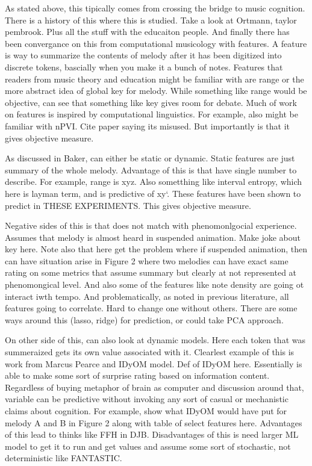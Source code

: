 \documentclass[english,man,floatsintext]{apa6}
\begin{document}
As stated above, this tipically comes from crossing the bridge to music cognition.
There is a history of this where this is studied.
Take a look at Ortmann, taylor pembrook.
Plus all the stuff with the educaiton people.
And finally there has been convergance on this from computational musicology with features.
A feature is way to summarize the contents of melody after it has been digitized into discrete tokens, bascially when you make it a bunch of notes.
Features that readers from music theory and education might be familiar with are range or the more abstract idea of global key for melody.
While something like range would be objective, can see that something like key gives room for debate.
Much of work on features is inspired by computational linguistics.
For example, also might be familiar with nPVI.
Cite paper saying its misused.
But importantly is that it gives objective measure.

As discussed in Baker, can either be static or dynamic.
Static features are just summary of the whole melody.
Advantage of this is that have single number to describe.
For example, range is xyz.
Also sometthing like interval entropy, which here is layman term, and is predictive of xy`.
These features have been shown to predict in THESE EXPERIMENTS.
This gives objective measure.

Negative sides of this is that does not match with phenomonlgocial experience.
Assumes that melody is almost heard in suspended animation.
Make joke about key here.
Note also that here get the problem where if suspended animation, then can have situation arise in Figure 2 where two melodies can have exact same rating on some metrics that assume summary but clearly at not represented at phenomongical level.
And also some of the features like note density are going ot interact iwth tempo.
And problematically, as noted in previous literature, all features going to correlate.
Hard to change one without others.
There are some ways around this (lasso, ridge) for prediction, or could take PCA approach.

On other side of this, can also look at dynamic models.
Here each token that was summeraized gets its own value associated with it.
Clearlest example of this is work from Marcus Pearce and IDyOM model.
Def of IDyOM here.
Essentially is able to make some sort of surprise rating based on information content.
Regardless of buying metaphor of brain as computer and discussion around that, variable can be predictive without invoking any sort of casual or mechanistic claims about cognition.
For example, show what IDyOM would have put for melody A and B in Figure 2 along with table of select features here.
Advantages of this lead to thinks like FFH in DJB.
Disadvantages of this is need larger ML model to get it to run and get values and assume some sort of stochastic, not deterministic like FANTASTIC.
\end{document}
